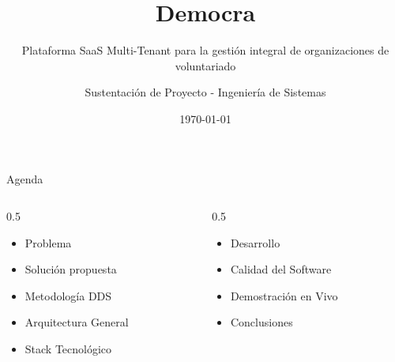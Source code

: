 \documentclass[aspectratio=169]{beamer}
\title{Democra}
\subtitle{Plataforma SaaS Multi-Tenant para la gestión integral de organizaciones de voluntariado}
\author{Sustentación de Proyecto - Ingeniería de Sistemas}
\date{\today}
\institute{Arquitectura de Software}
\begin{document}
\begin{frame}[plain]
    \titlepage
    \begin{center}
    \end{center}
\end{frame}

\begin{frame}{Agenda}
    \begin{columns}[T]
        \begin{column}{0.5\textwidth}
            \begin{itemize}
                \item Problema
                \item Solución propuesta
                \item Metodología DDS
                \item Arquitectura General
                \item Stack Tecnológico
            \end{itemize}
        \end{column}
        \begin{column}{0.5\textwidth}
            \begin{itemize}
                \item Desarrollo
                \item Calidad del Software
                \item Demostración en Vivo
                \item Conclusiones
            \end{itemize}
        \end{column}
    \end{columns}
\end{frame}
\end{document}
